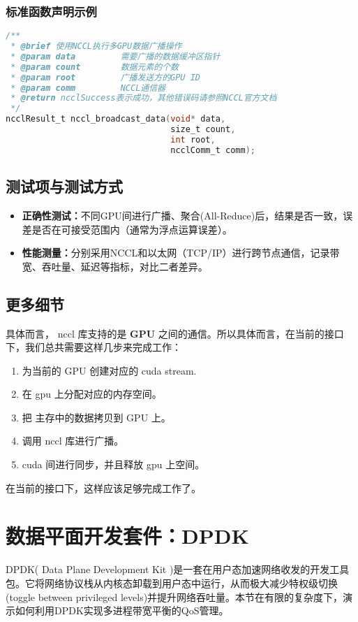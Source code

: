 \subsubsection{标准函数声明示例}
\begin{lstlisting}[language=C, caption={示例：NCCL通信例程接口}]
/**
 * @brief 使用NCCL执行多GPU数据广播操作
 * @param data         需要广播的数据缓冲区指针
 * @param count        数据元素的个数
 * @param root         广播发送方的GPU ID
 * @param comm         NCCL通信器
 * @return ncclSuccess表示成功，其他错误码请参照NCCL官方文档
 */
ncclResult_t nccl_broadcast_data(void* data, 
                                 size_t count, 
                                 int root, 
                                 ncclComm_t comm);
\end{lstlisting}

\subsection{测试项与测试方式}
\begin{itemize}
    \item \textbf{正确性测试：}不同GPU间进行广播、聚合(All-Reduce)后，结果是否一致，误差是否在可接受范围内（通常为浮点运算误差）。
    \item \textbf{性能测量：}分别采用NCCL和以太网（TCP/IP）进行跨节点通信，记录带宽、吞吐量、延迟等指标，对比二者差异。
\end{itemize}

\subsection{更多细节}
具体而言， nccl 库支持的是 \textbf{GPU} 之间的通信。所以具体而言，在当前的接口下，我们总共需要这样几步来完成工作：
\begin{enumerate}
    \item 为当前的 GPU 创建对应的 cuda stream.
    \item 在 gpu 上分配对应的内存空间。
    \item 把 主存中的数据拷贝到 GPU 上。
    \item 调用 nccl 库进行广播。
    \item cuda 间进行同步，并且释放 gpu 上空间。
\end{enumerate}
在当前的接口下，这样应该足够完成工作了。

\section{数据平面开发套件：DPDK}
DPDK( Data Plane Development Kit )是一套在用户态加速网络收发的开发工具包。它将网络协议栈从内核态卸载到用户态中运行，从而极大减少特权级切换(toggle between privileged levels)并提升网络吞吐量。本节在有限的复杂度下，演示如何利用DPDK实现多进程带宽平衡的QoS管理。


